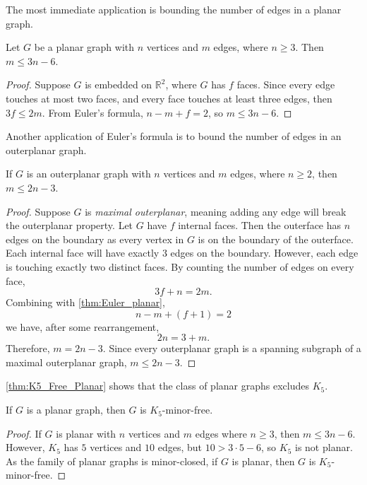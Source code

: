 The most immediate application is bounding the number of edges in a planar graph.
\begin{proposition}\label{thm:planar_graph_edge_bound}
	Let $G$ be a planar graph with $n$ vertices and $m$ edges, where $n \geq 3$. Then $m \leq 3n - 6$.
\end{proposition}
\begin{proof}
	Suppose $G$ is embedded on $\mathbb{R}^2$, where $G$ has $f$ faces. Since every edge touches at most two faces, and every face touches at least three edges, then $3f \leq 2m$. From Euler's formula, $n - m + f = 2$, so $m \leq 3n - 6$. 
\end{proof}

Another application of Euler's formula is to bound the number of edges in an outerplanar graph.
\begin{proposition}\label{thm:outerplanar_bound}
	If \(G\) is an outerplanar graph with \(n\) vertices and \(m\) edges, where $n \geq 2$, then \(m \leq 2n - 3\).
\end{proposition}

\begin{proof}
	Suppose \(G\) is \textit{maximal outerplanar}, meaning adding any edge will break the outerplanar property. Let $G$ have \(f\) internal faces. Then the outerface has \(n\) edges on the boundary as every vertex in $G$ is on the boundary of the outerface. Each internal face will have exactly \(3\) edges on the boundary. However, each edge is touching exactly two distinct faces. By counting the number of edges on every face,
	\begin{equation*}
		3 f + n = 2m.
	\end{equation*}
	Combining with \cref{thm:Euler_planar},
	\begin{equation*}
		n - m + (f + 1) = 2
	\end{equation*}
	we have, after some rearrangement,
	\begin{equation*}
		2n = 3 + m.
	\end{equation*}
	Therefore, \(m = 2n - 3\). Since every outerplanar graph is a spanning subgraph of a maximal outerplanar graph, \(m \leq 2n - 3\).
\end{proof}
\cref{thm:K5_Free_Planar} shows that the class of planar graphs excludes $K_5$. 
\begin{lemma}\label{thm:K5_Free_Planar}
	If \(G\) is a planar graph, then \(G\) is \(K_5\)-minor-free.
\end{lemma}
\begin{proof}
	If \(G\) is planar with \(n\) vertices and \(m\) edges where $n \geq 3$, then \(m \leq 3n -6\).
	However, \(K_5\) has \(5\) vertices and \(10\) edges, but  \( 10 > 3 \cdot 5 - 6\), so \(K_5\) is not planar. As the family of planar graphs is minor-closed, if \(G\) is planar, then $G$ is \(K_5\)-minor-free.
\end{proof}

